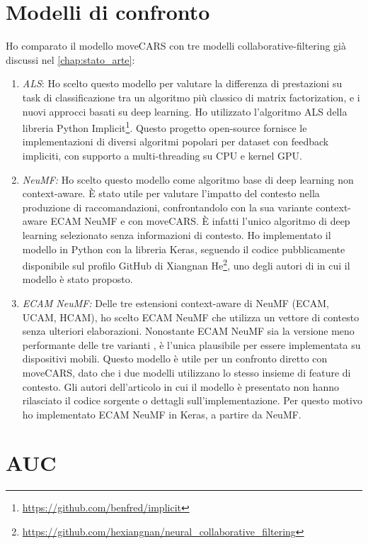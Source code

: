 \documentclass[12pt,italian]{report}
\begin{document}
\section{Modelli di confronto} \label{sec:comp-model}
Ho comparato il modello moveCARS con tre modelli collaborative-filtering già discussi nel \autoref{chap:stato_arte}:
\begin{enumerate}
\item \textit{ALS}: Ho scelto questo modello per valutare la differenza di prestazioni su task di classificazione tra un algoritmo più classico di matrix factorization,
e i nuovi approcci basati su deep learning. Ho utilizzato l'algoritmo ALS della libreria Python Implicit\footnote{\url{https://github.com/benfred/implicit}}. Questo progetto open-source fornisce le implementazioni di diversi algoritmi popolari per dataset con feedback impliciti, con supporto a multi-threading su CPU e kernel GPU. 

\item \textit{NeuMF:} Ho scelto questo modello come algoritmo base di deep learning non context-aware. \`E stato utile 
per valutare l'impatto del contesto nella produzione di raccomandazioni, confrontandolo con la sua variante context-aware ECAM NeuMF e con moveCARS. \`E infatti l'unico algoritmo di deep learning selezionato senza informazioni di contesto. Ho implementato il modello in Python con la libreria Keras, seguendo il codice pubblicamente disponibile sul profilo GitHub di Xiangnan He\footnote{\url{https://github.com/hexiangnan/neural_collaborative_filtering}}, uno degli autori di \cite{NCF} in cui il modello è stato proposto.

\item \textit{ECAM NeuMF:} Delle tre estensioni context-aware di NeuMF (ECAM, UCAM, HCAM), ho scelto ECAM NeuMF che utilizza un vettore di contesto senza ulteriori elaborazioni. Nonostante ECAM NeuMF sia la versione meno performante delle tre varianti \cite{context-aware-deep-learning}, è l'unica plausibile per essere implementata su dispositivi mobili. Questo modello è utile per un confronto diretto con moveCARS, dato che i due modelli utilizzano lo stesso insieme di feature di contesto. Gli autori dell'articolo in cui il modello è presentato non hanno rilasciato il codice sorgente o dettagli sull'implementazione. Per questo motivo ho implementato ECAM NeuMF in Keras, a partire da NeuMF.
\end{enumerate}

\section{AUC} \label{sec:auc}
\end{document}

